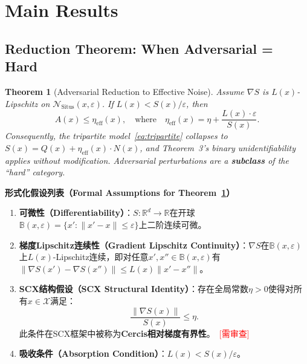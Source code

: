 \documentclass[12pt,a4paper]{article}
\newtheorem{theorem}{Theorem}[section]
\newcommand{\critical}{\textcolor{red}{\small\textsf{[需审查]}}}
\newcommand{\R}{\mathbb{R}}
\newcommand{\cX}{\mathcal{X}}
\newcommand{\cN}{\mathcal{N}}
\newcommand{\Situs}{\mathrm{Situs}}
\newcommand{\bB}{\mathbb{B}}       %
\begin{document}
\section{Main Results}

\subsection{Reduction Theorem: When Adversarial = Hard}

\begin{theorem}[Adversarial Reduction to Effective Noise]
\label{thm:reduction}
Assume $\nabla S$ is $L(x)$-Lipschitz on $\cN_{\Situs}(x, \varepsilon)$.
If $L(x) < S(x)/\varepsilon$, then
\begin{equation}\label{eq:reduction-bound}
    A(x) \leq \eta_{\mathrm{eff}}(x),
    \quad\text{where}\quad
    \eta_{\mathrm{eff}}(x) = \eta + \frac{L(x) \cdot \varepsilon}{S(x)}.
\end{equation}
Consequently, the tripartite model~\eqref{eq:tripartite} collapses to
$S(x) = Q(x) + \eta_{\mathrm{eff}}(x) \cdot N(x)$, and Theorem~3's binary
unidentifiability applies without modification.  Adversarial perturbations
are a \textbf{subclass} of the ``hard'' category.
\end{theorem}

\medskip\noindent
\textbf{形式化假设列表（Formal Assumptions for Theorem~\ref{thm:reduction}）}

\begin{enumerate}[label=A\arabic*:]
\item \textbf{可微性（Differentiability）}：$S: \R^d \to \R$在开球$\bB(x, \varepsilon) = \{x': \|x'-x\| \leq \varepsilon\}$上二阶连续可微。\label{ass:ar1-diff}
\item \textbf{梯度Lipschitz连续性（Gradient Lipschitz Continuity）}：$\nabla S$在$\bB(x, \varepsilon)$上$L(x)$-Lipschitz连续，即对任意$x', x'' \in \bB(x, \varepsilon)$有$\|\nabla S(x') - \nabla S(x'')\| \leq L(x) \|x' - x''\|$。\label{ass:ar1-lip}
\item \textbf{SCX结构假设（SCX Structural Identity）}：存在全局常数$\eta > 0$使得对所有$x \in \cX$满足：
   \begin{equation}\label{eq:scx-struct-id}
   \frac{\|\nabla S(x)\|}{S(x)} \leq \eta.
   \end{equation}
   此条件在SCX框架中被称为\textbf{Cercis相对梯度有界性}。~\critical
   \label{ass:ar1-scx}
\item \textbf{吸收条件（Absorption Condition）}：$L(x) < S(x)/\varepsilon$。\label{ass:ar1-abs}
\end{enumerate}
\end{document}
